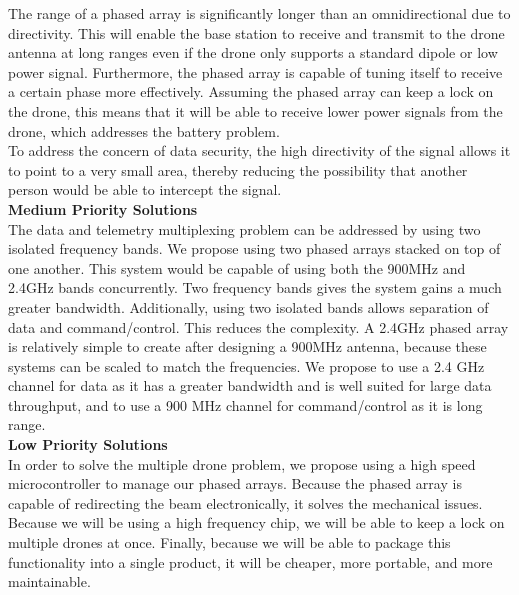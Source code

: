 \documentclass[11pt]{article}
\numberwithin{figure}{section}
\begin{document}
	The range of a phased array is significantly longer than an omnidirectional due to directivity.  This will enable the base station to receive and transmit to the drone antenna at long ranges even if the drone only supports a standard dipole or low power signal.  Furthermore, the phased array is capable of tuning itself to receive a certain phase more effectively.  Assuming the phased array can keep a lock on the drone, this means that it will be able to receive lower power signals from the drone, which addresses the battery problem.  \\
	
	To address the concern of data security, the high directivity of the signal allows it to point to a very small area, thereby reducing the possibility that another person would be able to intercept the signal.\\
	
	\textbf{Medium Priority Solutions} \\
	The data and telemetry multiplexing problem can be addressed by using two isolated frequency bands.  We propose using two phased arrays stacked on top of one another.  This system would be capable of using both the 900MHz and 2.4GHz bands concurrently.  Two frequency bands gives the system gains a much greater bandwidth.  Additionally, using two isolated bands allows separation of data and command/control.  This reduces the complexity.  A 2.4GHz phased array is relatively simple to create after designing a 900MHz antenna, because these systems can be scaled to match the frequencies.  We propose to use a 2.4 GHz channel for data as it has a greater bandwidth and is well suited for large data throughput, and to use a 900 MHz channel for command/control as it is long range.  \\
	
	\textbf{Low Priority Solutions} \\
	In order to solve the multiple drone problem, we propose using a high speed microcontroller to manage our phased arrays.  Because the phased array is capable of redirecting the beam electronically, it solves the mechanical issues.  Because we will be using a high frequency chip, we will be able to keep a lock on multiple drones at once.  Finally, because we will be able to package this functionality into a single product, it will be cheaper, more portable, and more maintainable.
\end{document}
